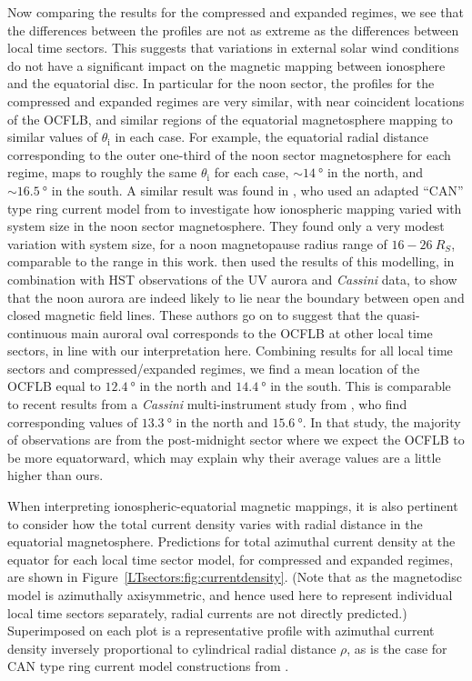 Now comparing the results for the compressed and expanded regimes, we see that the differences between the profiles are not as extreme as the differences between local time sectors. This suggests that variations in external solar wind conditions do not have a significant impact on the magnetic mapping between ionosphere and the equatorial disc. In particular for the noon sector, the profiles for the compressed and expanded regimes are very similar, with near coincident locations of the OCFLB, and similar regions of the equatorial magnetosphere mapping to similar values of $\theta_\mathrm{i}$ in each case. For example, the equatorial radial distance corresponding to the outer one-third of the noon sector magnetosphere for each regime, maps to roughly the same $\theta_\mathrm{i}$ for each case, ${\sim}\SI{14}{\degree}$ in the north, and ${\sim}\SI{16.5}{\degree}$ in the south. A similar result was found in \citet{bunce2008}, who used an adapted ``CAN'' type \citep{connerney1981b,connerney1983} ring current model from \citet{bunce2007} to investigate how ionospheric mapping varied with system size in the noon sector magnetosphere. They found only a very modest variation with system size, for a noon magnetopause radius range of $16-\SI{26}{R_S}$, comparable to the range in this work. \citet{bunce2008b} then used the results of this modelling, in combination with HST observations of the UV aurora and \textit{Cassini} data, to show that the noon aurora are indeed likely to lie near the boundary between open and closed magnetic field lines. These authors go on to suggest that the quasi-continuous main auroral oval corresponds to the OCFLB at other local time sectors, in line with our interpretation here. Combining results for all local time sectors and compressed/expanded regimes, we find a mean location of the OCFLB equal to $\SI{12.4}{\degree}$ in the north and $\SI{14.4}{\degree}$ in the south. This is comparable to recent results from a \textit{Cassini} multi-instrument study from \citet{jinks2014}, who find corresponding values of $\SI{13.3}{\degree}$ in the north and $\SI{15.6}{\degree}$. In that study, the majority of observations are from the post-midnight sector where we expect the OCFLB to be more equatorward, which may explain why their average values are a little higher than ours.

When interpreting ionospheric-equatorial magnetic mappings, it is also pertinent to consider how the total current density varies with radial distance in the equatorial magnetosphere. Predictions for total azimuthal current density at the equator for each local time sector model, for compressed and expanded regimes, are shown in Figure~\ref{LTsectors:fig:currentdensity}. (Note that as the magnetodisc model is azimuthally axisymmetric, and hence used here to represent individual local time sectors separately, radial currents are not directly predicted.) Superimposed on each plot is a representative profile with azimuthal current density inversely proportional to cylindrical radial distance $\rho$, as is the case for CAN type ring current model constructions from \citet{connerney1981b,connerney1983}.

